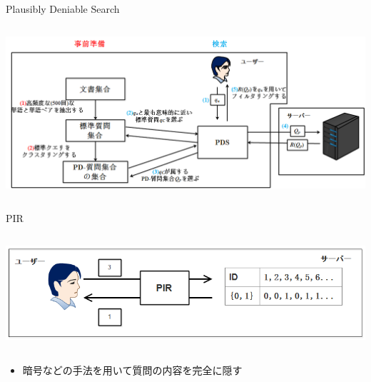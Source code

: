 \documentclass[14pt,xcolor=dvipsnames,table,dvipdfmx]{beamer}
\begin{document}
\begin{frame}{Plausibly Deniable Search}
	\begin{columns}[t]
		\begin{column}{1.0\textwidth} %
			\includegraphics[width=\columnwidth]{photo13.png}
		\end{column}
	\end{columns}
\end{frame}

\begin{frame}{PIR \cite{ostrovsky_survey_2007}}
	\begin{columns}[t]
		\begin{column}{0.8\textwidth} %
			\includegraphics[width=\columnwidth]{photo7.png}
		\end{column}
	\end{columns}
	\begin{block}{} 
		\begin{itemize}
			\item 暗号などの手法を用いて質問の内容を完全に隠す
		\end{itemize}
	\end{block}
\end{frame}
\end{document}
